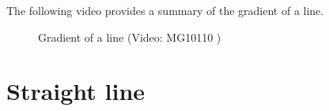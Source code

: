 The following video provides a summary of the gradient of a line.
\setcounter{subfigure}{0}
\begin{figure}[H] %
\textnormal{Gradient of a line}\vspace{.1in} \nopagebreak
\label{m39108*yt-media1}\label{m39108*yt-video1}
 { (Video:  MG10110 )}
\vspace{2pt}
\vspace{.1in}
\end{figure}      
%     
%     
%     
\section{Straight line}

